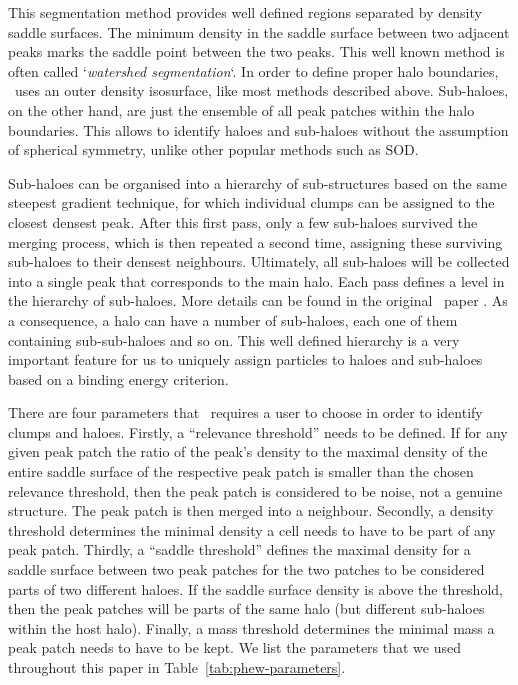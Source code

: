 This segmentation method provides well defined regions separated by
density saddle surfaces. The minimum density in the saddle surface
between two adjacent peaks marks the saddle point between the two
peaks.  This well known method is often called `\emph{watershed
segmentation}`. In order to define proper halo boundaries, \phew\ uses
an outer density isosurface, like most methods described
above. Sub-haloes, on the other hand, are just the ensemble of all
peak patches within the halo boundaries. This allows to identify
haloes and sub-haloes without the assumption of spherical symmetry,
unlike other popular methods such as SOD.

Sub-haloes can be organised into a hierarchy of sub-structures based
on the same steepest gradient technique, for which individual clumps
can be assigned to the closest densest peak.  After this first pass,
only a few sub-haloes survived the merging process, which is then
repeated a second time, assigning these surviving sub-haloes to their
densest neighbours.  Ultimately, all sub-haloes will be collected into
a single peak that corresponds to the main halo. Each pass defines a
level in the hierarchy of sub-haloes. More details can be found in the
original \phew\ paper \citep{PHEW}.  As a consequence, a halo can have
a number of sub-haloes, each one of them containing sub-sub-haloes and
so on.  This well defined hierarchy is a very important feature for us
to uniquely assign particles to haloes and sub-haloes based on a
binding energy criterion.
 
There are four parameters that \phew\ requires a user to choose in
order to identify clumps and haloes.  Firstly, a ``relevance
threshold'' needs to be defined.  If for any given peak patch the
ratio of the peak's density to the maximal density of the entire
saddle surface of the respective peak patch is smaller than the chosen
relevance threshold, then the peak patch is considered to be noise,
not a genuine structure.  The peak patch is then merged into a
neighbour.  Secondly, a density threshold determines the minimal
density a cell needs to have to be part of any peak patch.  Thirdly, a
``saddle threshold'' defines the maximal density for a saddle surface
between two peak patches for the two patches to be considered parts of
two different haloes.  If the saddle surface density is above the
threshold, then the peak patches will be parts of the same halo (but
different sub-haloes within the host halo).  Finally, a mass threshold
determines the minimal mass a peak patch needs to have to be kept.  We
list the parameters that we used throughout this paper in Table~\ref{tab:phew-parameters}.

